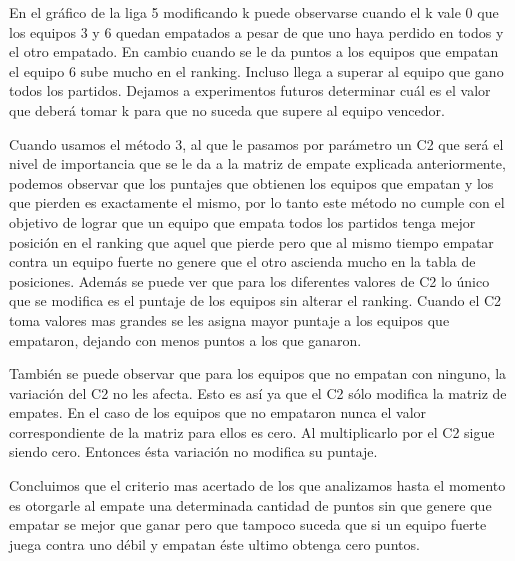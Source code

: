             En el gráfico de la liga 5 modificando k puede observarse cuando el k vale 0 que los equipos 3 y 6 quedan empatados a pesar de que uno haya perdido en todos y el otro empatado. En cambio cuando se le da puntos a los equipos que empatan el equipo 6 sube mucho en el ranking. Incluso llega a superar al equipo que gano todos los partidos. Dejamos a experimentos futuros determinar cuál es el valor que deberá tomar k para que no suceda que supere al equipo vencedor.
            
            Cuando usamos el método 3, al que le pasamos por parámetro un C2 que será el nivel de importancia que se le da a la matriz de empate explicada anteriormente, podemos observar que los puntajes que obtienen los equipos que empatan y los que pierden es exactamente el mismo, por lo tanto este método no cumple con el objetivo de lograr que un equipo que empata todos los partidos tenga mejor posición en el ranking que aquel que pierde pero que al mismo tiempo empatar contra un equipo fuerte no genere que el otro ascienda mucho en la tabla de posiciones. Además se puede ver que para los diferentes valores de C2 lo único que se modifica es el puntaje de los equipos sin alterar el ranking. Cuando el C2 toma valores mas grandes se les asigna mayor puntaje a los equipos que empataron, dejando con menos puntos a los que ganaron. 

            También se puede observar que para los equipos que no empatan con ninguno, la variación del C2 no les afecta. Esto es así ya que el C2 sólo modifica la matriz de empates. En el caso de los equipos que no empataron nunca el valor correspondiente de la matriz para ellos es cero. Al multiplicarlo por el C2 sigue siendo cero. Entonces ésta variación no modifica su puntaje.

            Concluimos que el criterio mas acertado de los que analizamos hasta el momento es otorgarle al empate una determinada cantidad de puntos sin que genere que empatar se mejor que ganar pero que tampoco suceda que si un equipo fuerte juega contra uno débil y empatan éste ultimo obtenga cero puntos. 
